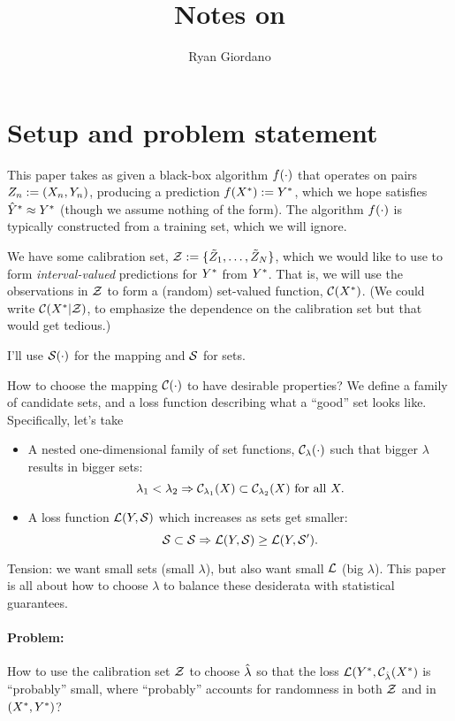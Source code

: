 \documentclass[twoside,11pt]{article}
\numberwithin{equation}{section}
\begin{document}
\title{Notes on \citet{bates:2021:distributionpredictionsets}}

\author{Ryan Giordano}


\maketitle

\section{Setup and problem statement}


This paper takes as given a black-box algorithm $f(\cdot)$ that operates on
pairs $Z_n := (X_n, Y_n)$, producing a prediction $f(X^{*}) := Y^{*}$,
which we hope satisfies $\hat{Y}^{*} \approx Y^{*}$ (though we assume nothing of the
form).  The algorithm $f(\cdot)$ is typically constructed from a training
set, which we will ignore.

We have some calibration set, $\mathcal{Z} := \{ \tilde{Z}_1, \ldots, \tilde{Z}_N\}$,
which we would like to use to form \textit{interval-valued} predictions
for $Y^{*}$ from $Y^{*}$.  That is, we will use the observations in $\mathcal{Z}$
to form a (random) set-valued function, $\mathcal{C}(X^{*})$.  (We could
write $\mathcal{C}(X^{*} | \mathcal{Z})$, to emphasize
the dependence on the calibration set but that would get tedious.)

I'll use $\mathcal{S}(\cdot)$ for the mapping and $\mathcal{S}$ for sets.

How to choose the mapping $\mathcal{C}(\cdot)$ to have desirable properties?
We define a family of candidate sets, and a loss function describing
what a ``good'' set looks like.  Specifically, let's take
%
\begin{itemize}
%
    \item A nested one-dimensional family of set functions,
    $\mathcal{C}_{\lambda}(\cdot)$ such that bigger $\lambda$ results in bigger sets:
    $$\lambda_1 < \lambda_2 \Rightarrow \mathcal{C}_{\lambda_1}(X) \subset
    \mathcal{C}_{\lambda_2}(X) \textrm{ for all }X.$$
    \item A loss function $\mathcal{L}(Y, \mathcal{S})$ which increases as sets get smaller:
    $$\mathcal{S} \subset \mathcal{S} \Rightarrow \mathcal{L}(Y, \mathcal{S}) \ge \mathcal{L}(Y,\mathcal{S}').$$
%
\end{itemize}
%
Tension: we want small sets (small $\lambda$), but also want small $\mathcal{L}$
(big $\lambda$).  This paper is all about how to choose $\lambda$
to balance these desiderata with statistical guarantees.


\paragraph{Problem: } How to use the calibration
set $\mathcal{Z}$ to choose $\hat{\lambda}$ so that the loss
$\mathcal{L}(Y^{*}, \mathcal{C}_{\hat{\lambda}}(X^{*})$ is ``probably'' small,
where ``probably'' accounts for randomness in both $\mathcal{Z}$
and in $(X^{*}, Y^{*})$?
\end{document}
